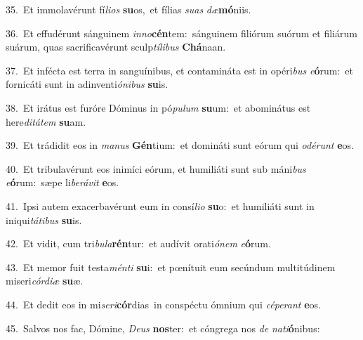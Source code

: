 {\numbfont\textcolor{\numbcolor}{35.}}~Et immolavérunt fí\-\textit{li}\-\textit{os} \textbf{su}\-os,~\star et fílias \textit{su}\-\textit{as} \textit{dæ}\-\textbf{mó}niis.\par
{\numbfont\textcolor{\numbcolor}{36.}}~Et effudérunt sánguinem \textit{in}\-\textit{no}\textbf{cén}tem:~\star sánguinem filiórum suórum et filiárum suárum, quas sacrificavérunt sculp\-\textit{tí}\-\textit{li}\textit{bus} \textbf{Chá}\-naan.\par
{\numbfont\textcolor{\numbcolor}{37.}}~Et infécta est terra in sanguínibus, et contamináta est in opéri\textit{bus} \textit{e}\-\textbf{ó}rum:~\star et fornicáti sunt in adinventi\-\textit{ó}\-\textit{ni}\textit{bus} \textbf{su}\-is.\par
{\numbfont\textcolor{\numbcolor}{38.}}~Et irátus est furóre Dóminus in pó\-\textit{pu}\-\textit{lum} \textbf{su}\-um:~\star et abominátus est here\-\textit{di}\-\textit{tá}\textit{tem} \textbf{su}\-am.\par
{\numbfont\textcolor{\numbcolor}{39.}}~Et trádidit eos in \textit{ma}\-\textit{nus} \textbf{Gén}\-tium:~\star et domináti sunt eórum qui \textit{o}\-\textit{dé}\textit{runt} \textbf{e}\-os.\par
{\numbfont\textcolor{\numbcolor}{40.}}~Et tribulavérunt eos inimíci eórum, et humiliáti sunt sub máni\textit{bus} \textit{e}\-\textbf{ó}rum:~\star sæpe li\-\textit{be}\-\textit{rá}\textit{vit} \textbf{e}\-os.\par
{\numbfont\textcolor{\numbcolor}{41.}}~Ipsi autem exacerbavérunt eum in consí\-\textit{li}\-\textit{o} \textbf{su}\-o:~\star et humiliáti sunt in iniqui\-\textit{tá}\-\textit{ti}\textit{bus} \textbf{su}\-is.\par
{\numbfont\textcolor{\numbcolor}{42.}}~Et vidit, cum tri\-\textit{bu}\-\textit{la}\textbf{rén}tur:~\star et audívit orati\-\textit{ó}\-\textit{nem} \textit{e}\-\textbf{ó}rum.\par
{\numbfont\textcolor{\numbcolor}{43.}}~Et memor fuit testa\-\textit{mén}\-\textit{ti} \textbf{su}\-i:~\star et pœnítuit eum secúndum multitúdinem miseri\-\textit{cór}\-\textit{di}\textit{æ} \textbf{su}\-æ.\par
{\numbfont\textcolor{\numbcolor}{44.}}~Et dedit eos in mi\-\textit{se}\-\textit{ri}\textbf{cór}dias~\star in conspéctu ómnium qui \textit{cé}\-\textit{pe}\textit{rant} \textbf{e}\-os.\par
{\numbfont\textcolor{\numbcolor}{45.}}~Salvos nos fac, Dómine, \textit{De}\-\textit{us} \textbf{nos}\-ter:~\star et cóngrega nos \textit{de} \textit{na}\-\textit{ti}\textbf{ó}nibus:\par
